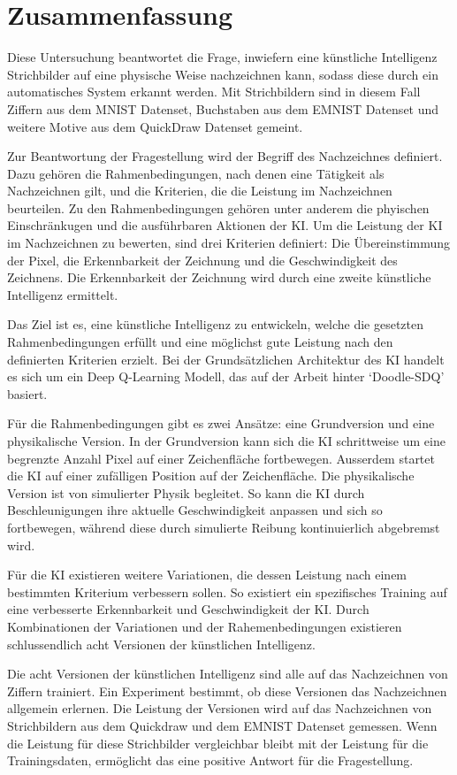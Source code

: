 \chapter{Zusammenfassung}
Diese Untersuchung beantwortet die Frage, inwiefern eine künstliche Intelligenz
Strichbilder auf eine physische Weise nachzeichnen kann, sodass diese durch ein
automatisches System erkannt werden. Mit Strichbildern sind in diesem
Fall Ziffern aus dem MNIST Datenset, Buchstaben aus dem EMNIST Datenset und
weitere Motive aus dem QuickDraw Datenset gemeint. 

Zur Beantwortung der Fragestellung wird der Begriff des Nachzeichnes definiert.
Dazu gehören die Rahmenbedingungen, nach denen eine Tätigkeit als Nachzeichnen
gilt, und die Kriterien, die die Leistung im Nachzeichnen beurteilen. Zu den
Rahmenbedingungen gehören unter anderem die phyischen Einschränkugen und die
ausführbaren Aktionen der KI. Um die Leistung der KI im Nachzeichnen zu
bewerten, sind drei Kriterien definiert: Die Übereinstimmung der Pixel, die
Erkennbarkeit der Zeichnung und die Geschwindigkeit des Zeichnens. Die
Erkennbarkeit der Zeichnung wird durch eine zweite künstliche Intelligenz
ermittelt.

Das Ziel ist es, eine künstliche Intelligenz zu entwickeln, welche die gesetzten
Rahmenbedingungen erfüllt und eine möglichst gute Leistung nach den definierten
Kriterien erzielt. Bei der Grundsätzlichen Architektur des KI handelt es sich um
ein Deep Q-Learning Modell, das auf der Arbeit hinter `Doodle-SDQ'
basiert.

Für die Rahmenbedingungen gibt es zwei Ansätze: eine Grundversion und eine
physikalische Version. In der Grundversion kann sich die KI schrittweise um eine
begrenzte Anzahl Pixel auf einer Zeichenfläche fortbewegen. Ausserdem startet
die KI auf einer zufälligen Position auf der Zeichenfläche. Die physikalische
Version ist von simulierter Physik begleitet. So kann die KI durch
Beschleunigungen ihre aktuelle Geschwindigkeit anpassen und sich so fortbewegen,
während diese durch simulierte Reibung kontinuierlich abgebremst wird. 

Für die KI existieren weitere Variationen, die dessen Leistung nach einem
bestimmten Kriterium verbessern sollen. So existiert ein spezifisches Training
auf eine verbesserte Erkennbarkeit und Geschwindigkeit der KI. Durch
Kombinationen der Variationen und der Rahemenbedingungen existieren
schlussendlich acht Versionen der künstlichen Intelligenz.

Die acht Versionen der künstlichen Intelligenz sind alle auf das Nachzeichnen
von Ziffern trainiert. Ein Experiment bestimmt, ob diese Versionen das
Nachzeichnen allgemein erlernen. Die Leistung der Versionen wird auf das
Nachzeichnen von Strichbildern aus dem Quickdraw und dem EMNIST Datenset
gemessen. Wenn die Leistung für diese Strichbilder vergleichbar bleibt mit der
Leistung für die Trainingsdaten, ermöglicht das eine positive Antwort für
die Fragestellung.

